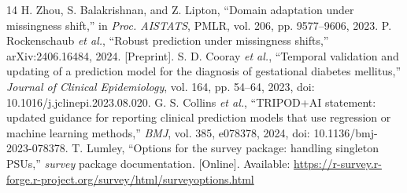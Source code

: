 \documentclass[conference,letterpaper]{IEEEtran}
\begin{document}
\begin{thebibliography}{14}
 H. Zhou, S. Balakrishnan, and Z. Lipton, ``Domain adaptation under missingness shift,'' in \emph{Proc. AISTATS}, PMLR, vol. 206, pp. 9577--9606, 2023.
 P. Rockenschaub \emph{et al.}, ``Robust prediction under missingness shifts,'' arXiv:2406.16484, 2024. [Preprint].
 S. D. Cooray \emph{et al.}, ``Temporal validation and updating of a prediction model for the diagnosis of gestational diabetes mellitus,'' \emph{Journal of Clinical Epidemiology}, vol. 164, pp. 54--64, 2023, doi: 10.1016/j.jclinepi.2023.08.020.
 G. S. Collins \emph{et al.}, ``TRIPOD+AI statement: updated guidance for reporting clinical prediction models that use regression or machine learning methods,'' \emph{BMJ}, vol. 385, e078378, 2024, doi: 10.1136/bmj-2023-078378.
 T. Lumley, ``Options for the survey package: handling singleton PSUs,'' \emph{survey} package documentation. [Online]. Available: \url{https://r-survey.r-forge.r-project.org/survey/html/surveyoptions.html}
\end{thebibliography}
\end{document}
